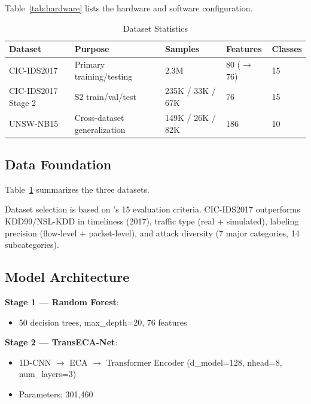 \documentclass[sigconf]{acmart}
\begin{document}
\noindent Table~\ref{tab:hardware} lists the hardware and software configuration.


\begin{table}[!t]
\caption{Dataset Statistics}
\label{tab:datasets}
\begin{tabular}{p{3.5cm}p{4.5cm}p{4.0cm}p{2.0cm}p{2.0cm}}
\toprule
\textbf{Dataset} & \textbf{Purpose} & \textbf{Samples} & \textbf{Features} & \textbf{Classes} \\
\midrule
CIC-IDS2017 & Primary training/testing & 2.3M & 80 ($\to$76) & 15 \\
CIC-IDS2017 Stage 2 & S2 train/val/test & 235K / 33K / 67K & 76 & 15 \\
UNSW-NB15 & Cross-dataset generalization & 149K / 26K / 82K & 186 & 10 \\
\bottomrule
\end{tabular}
\end{table}

\subsection{Data Foundation} Table~\ref{tab:datasets} summarizes the three datasets.

Dataset selection is based on \cite{16}'s 15 evaluation criteria. CIC-IDS2017 outperforms KDD99/NSL-KDD in timeliness (2017), traffic type (real + simulated), labeling precision (flow-level + packet-level), and attack diversity (7 major categories, 14 subcategories).

\subsection{Model Architecture}
\textbf{Stage 1 --- Random Forest}:
\begin{itemize}
\item 50 decision trees, max\_depth=20, 76 features
\end{itemize}

\textbf{Stage 2 --- TransECA-Net}:
\begin{itemize}
\item 1D-CNN $\to$ ECA \cite{23} $\to$ Transformer Encoder (d\_model=128, nhead=8, num\_layers=3)
\item Parameters: 301,460
\end{itemize}
\end{document}

